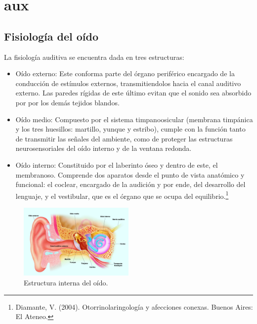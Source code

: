 



\tableofcontents
\newpage

\section{aux}

\subsection{Fisiología del oído}

La fisiología auditiva se encuentra dada en tres estructuras:
\begin{itemize}
	\item Oído externo:
	Este conforma parte del órgano periférico encargado de la conducción de estímulos externos, transmitiendolos hacia el canal auditivo externo. Las paredes rígidas de este último evitan que el sonido sea absorbido por por los demás tejidos blandos.
	\item Oído medio:
	Compuesto por el sistema timpanoosicular (membrana timpánica y los tres huesillos: martillo, yunque y estribo), cumple con la función tanto de transmitir las señales del ambiente, como de proteger las estructuras neurosensoriales del oído interno y de la ventana redonda.
	\item Oído interno:
	Constituido por el laberinto óseo y dentro de este, el membranoso. Comprende dos aparatos desde el punto de vista anatómico y funcional: el coclear, encargado de la audición y por ende, del desarrollo del lenguaje, y el vestibular, que es el órgano que se ocupa del equilibrio.\footnote{Diamante, V. (2004). Otorrinolaringología y afecciones conexas. Buenos Aires: El Ateneo.}
\end{itemize}

\begin{figure}[H]
\centering
	\includegraphics[width=0.5\textwidth]{Imagenes/Partes-del-oido.png}
	\caption{Estructura interna del oído.}
	\label{fig:oido}
\end{figure}

